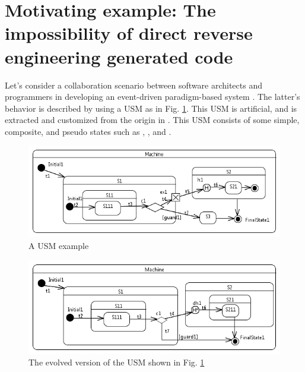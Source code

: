 \section{Motivating example: The impossibility of direct reverse engineering generated code}
\label{sec:motivation}
Let's consider a collaboration scenario between software architects and programmers in developing an event-driven paradigm-based system . The latter's behavior is described by using a USM as in Fig. \ref{fig:IllustrationExample1}.
This USM is artificial, and is extracted and customized from the origin in \cite{shuang_formalizing}.
This USM consists of some simple, composite, and pseudo states such as , , and .

\begin{figure}
	\centering
	\includegraphics[clip, trim=0.2cm 0.2cm 0.2cm 0.2cm, width=1.0\columnwidth]{figures/IllustrationExample1.png}
	\caption{A USM example} 
	\label{fig:IllustrationExample1}
\end{figure}

\begin{figure}
	\centering
	\includegraphics[clip, trim=0.2cm 0.2cm 0.1cm 0.2cm, width=1.0\columnwidth]{figures/IllustrationExample2.png}
	\caption{The evolved version of the USM shown in Fig. \ref{fig:IllustrationExample1}} 
	\label{fig:IllustrationExample2}
\end{figure}


